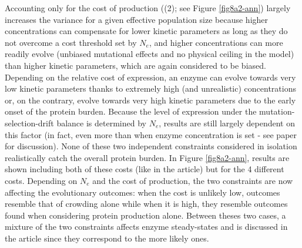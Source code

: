 \begin{figure}[h!]
\begin{center}
\begin{minipage}[c]{0.375\textwidth}
\label{fig8a-ann}
  \end{minipage}
\end{center}
\end{figure}

Accounting only for the cost of production ((2); see Figure \ref{fig8a2-ann}) largely increases the variance for a given effective population size because higher concentrations can compensate for lower kinetic parameters as long as they do not overcome a cost threshold set by $N_e$, and higher concentrations can more readily evolve (unbiased mutational effects and no physical ceiling in the model) than higher kinetic parameters, which are again considered to be biased. Depending on the relative cost of expression, an enzyme can evolve towards very low kinetic parameters thanks to extremely high (and unrealistic) concentrations or, on the contrary, evolve towards very high kinetic parameters due to the early onset of the protein burden. Because the level of expression under the mutation-selection-drift balance is determined by $N_e$, results are still largely dependent on this factor (in fact, even more than when enzyme concentration is set - see paper for discussion). None of these two independent constraints considered in isolation realistically catch the overall protein burden. In Figure \ref{fig8a2-ann}, results are shown including both of these costs (like in the article) but for the 4 different costs. Depending on $N_e$ and the cost of production, the two constraints are now affecting the evolutionary outcomes: when the cost is unlikely low, outcomes resemble that of crowding alone while when it is high, they resemble outcomes found when considering protein production alone. Between theses two cases, a mixture of the two constraints affects enzyme steady-states and is discussed in the article since they correspond to the more likely ones.

